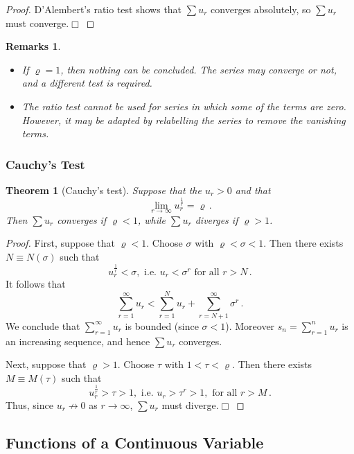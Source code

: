 \documentclass{article}
\theoremstyle{plain}\theoremheaderfont{\normalfont\itshape}\theorembodyfont{\rmfamily}\theoremseparator{.}\newtheorem*{rem}{Remark}\newtheorem*{ex}{Example}\newtheorem*{proof}{Proof}\newtheorem*{altp}{Alternative proof}
\theoremstyle{plain}\theoremheaderfont{\normalfont\bfseries}\theorembodyfont{\rmfamily}\theoremseparator{.}\newtheorem{thm}{Theorem}[section]\newtheorem{lem}[thm]{Lemma}\newtheorem{prop}[thm]{Proposition}\newtheorem*{cor}{Corollary}\newtheorem{defn}[thm]{Definition}\newtheorem{clm}[thm]{Claim}\newtheorem{clminproof}{Claim}
\theoremstyle{break}\theoremheaderfont{\normalfont\itshape}\theorembodyfont{\rmfamily}\theoremseparator{.\medskip}\newtheorem*{proofskip}{Proof}\newtheorem*{exs}{Examples}\newtheorem*{rems}{Remarks}
\theoremstyle{break}\theoremheaderfont{\normalfont\bfseries}\theorembodyfont{\rmfamily}\theoremseparator{.\medskip}\newtheorem{lemskip}[thm]{Lemma}\newtheorem{defnskip}[thm]{Definition}\newtheorem{propskip}[thm]{Proposition}\newtheorem{thmskip}[thm]{Theorem}
\numberwithin{equation}{section}
\newcommand{\qed}{\hfill\ensuremath{\Box}}
\begin{document}
	\begin{proof}
		D'Alembert's ratio test shows that \(\sum u_r\) converges absolutely, so \(\sum u_r\) must converge.\qed
	\end{proof}
	\begin{rems}
		\begin{itemize}[topsep=0pt]
			\item If \(\varrho=1\), then nothing can be concluded. The series may converge or not, and a different test is required.
			\item The ratio test cannot be used for series in which some of the terms are zero. However, it may be adapted by relabelling the series to remove the vanishing terms.
		\end{itemize}
	\end{rems}
	
	\subsubsection{Cauchy's Test}
	\begin{thm}[Cauchy's test]		
		Suppose that the \(u_r>0\) and that
		\[\lim_{r\to\infty}u_r^{\frac{1}{r}}=\varrho\,.\]
		Then \(\sum u_r\) converges if \(\varrho<1\), while \(\sum u_r\) diverges if \(\varrho>1\).
	\end{thm}
	\begin{proof}
		First, suppose that \(\varrho<1\). Choose \(\sigma\) with \(\varrho<\sigma<1\). Then there exists \(N\equiv N(\sigma)\) such that
		\[u_r^{\frac{1}{r}}<\sigma,\text{ i.e. }u_r<\sigma^r\text{ for all }r>N\,.\]
		It follows that
		\[\sum_{r=1}^{\infty}u_r<\sum_{r=1}^{N}u_r+\sum_{r=N+1}^{\infty}\sigma^r\,.\]
		We conclude that \(\sum_{r=1}^{\infty}u_r\) is bounded (since \(\sigma<1\)). Moreover \(s_n=\sum_{r=1}^{n}u_r\) is an increasing sequence, and hence \(\sum u_r\) converges.
		
		Next, suppose that \(\varrho>1\). Choose \(\tau\) with \(1<\tau<\varrho\). Then there exists \(M\equiv M(\tau)\) such that
		\[u_r^{\frac{1}{r}}>\tau>1,\text{ i.e. }u_r>\tau^r>1,\text{ for all }r>M\,.\]
		Thus, since \(u_r\not\to 0\) as \(r\to\infty\), \(\sum u_r\) must diverge.\qed
	\end{proof}
	\subsection{Functions of a Continuous Variable}
\end{document}
